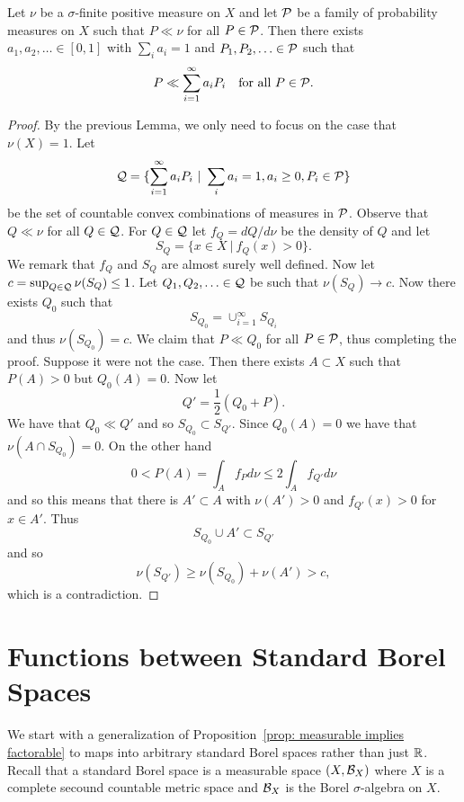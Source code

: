 \documentclass[twoside, a4paper, 10pt]{amsart}
\begin{document}
\begin{lemma} \label{lemma: countable sum dominates} Let $\nu$ be a $\sigma$-finite positive measure on $X$ and let $\mathcal{P}$ be a family of probability measures on $X$ such that $P \ll \nu$ for all $P \in \mathcal{P}$. Then there exists $a_1,a_2,\ldots \in [0,1]$ with $\sum_{i} a_i = 1$ and $P_1,P_2, \ldots \in \mathcal{P}$ such that $$P \ll \sum_{i=1}^{\infty} a_i P_i \quad \text{for all } P \in \mathcal{P}.$$

\end{lemma}

\begin{proof} By the previous Lemma, we only need to focus on the case that $\nu(X)=1$.  Let $$\mathcal{Q} = \{ \sum_{i=1}^{\infty} a_i P_i ~|~ \sum_{i} a_i = 1, a_i \geq 0, P_i \in \mathcal{P} \}$$ be the set of countable convex combinations of measures in $\mathcal{P}$. Observe that $Q \ll \nu$ for all $Q \in \mathcal{Q}$. For $Q \in \mathcal{Q}$ let $f_Q = dQ/d\nu$ be the density of $Q$ and let $$S_Q = \{ x \in X ~|~ f_Q(x)>0 \}.$$ We remark that $f_Q$ and $S_Q$ are almost surely well defined. Now let $c = \sup_{Q \in \mathcal{Q}} \nu(S_Q) \leq 1$. Let $Q_1,Q_2,\ldots \in \mathcal{Q}$ be such that $\nu(S_Q) \to c$. Now there exists $Q_0$ such that $$S_{Q_0} = \cup_{i=1}^{\infty} S_{Q_i}$$ and thus $\nu(S_{Q_0}) = c$. We claim that $P \ll Q_0$ for all $P \in \mathcal{P}$, thus completing the proof. Suppose it were not the case. Then there exists $A \subset X$ such that $P(A) >0$ but $Q_0(A)=0$. Now let $$Q' = \frac{1}{2}\left( Q_0 + P \right).$$ We have that $Q_0 \ll Q'$ and so $S_{Q_0} \subset S_{Q'}$. Since $Q_0(A)=0$ we have that $\nu(A \cap S_{Q_0}) = 0$. On the other hand $$0<P(A) = \int_{A} f_P d\nu \leq 2\int_A f_{Q'} d\nu$$ and so this means that there is $A' \subset A$ with $\nu(A')>0$ and $f_{Q'}(x) >0$ for $x \in A'$. Thus $$S_{Q_0} \cup A' \subset S_{Q'}$$ and so $$\nu(S_{Q'}) \geq \nu(S_{Q_0}) + \nu(A') > c,$$ which is a contradiction. \end{proof}

\section{Functions between Standard Borel Spaces}

We start with a generalization of Proposition~\ref{prop: measurable implies factorable} to maps into arbitrary standard Borel spaces rather than just $\mathbb{R}$. Recall that a standard Borel space is a measurable space $(X,\mathcal{B}_X)$ where $X$ is a complete secound countable metric space and $\mathcal{B}_X$ is the Borel $\sigma$-algebra on $X$.
\end{document}
